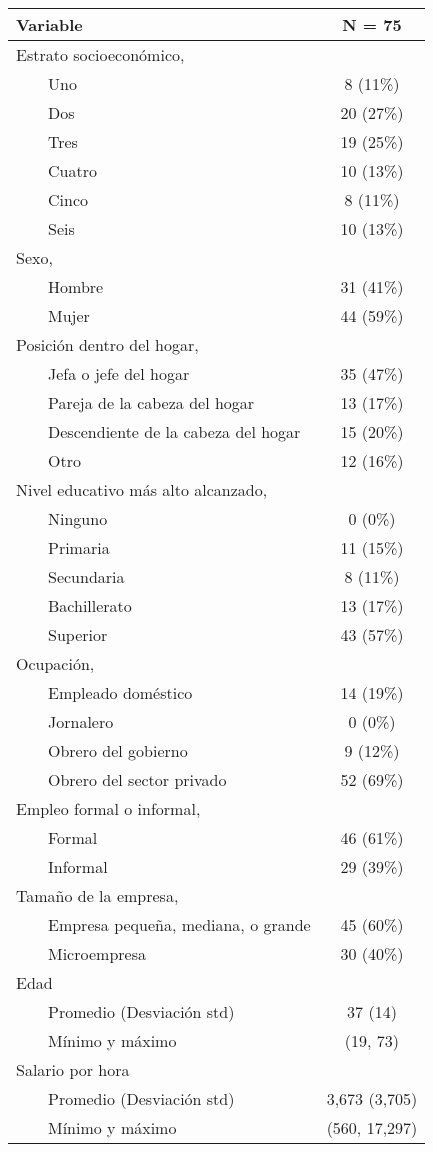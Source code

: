 \begin{longtable}{lc}
\toprule
\textbf{Variable} & \textbf{N = 75} \\ 
\midrule
Estrato socioeconómico,  &  \\ 
    Uno & 8  (11\%) \\ 
    Dos & 20  (27\%) \\ 
    Tres & 19  (25\%) \\ 
    Cuatro & 10  (13\%) \\ 
    Cinco & 8  (11\%) \\ 
    Seis & 10  (13\%) \\ 
Sexo,  &  \\ 
    Hombre & 31  (41\%) \\ 
    Mujer & 44  (59\%) \\ 
Posición dentro del hogar,  &  \\ 
    Jefa o jefe del hogar & 35  (47\%) \\ 
    Pareja de la cabeza del hogar & 13  (17\%) \\ 
    Descendiente de la cabeza del hogar & 15  (20\%) \\ 
    Otro & 12  (16\%) \\ 
Nivel educativo más alto alcanzado,  &  \\ 
    Ninguno & 0  (0\%) \\ 
    Primaria & 11  (15\%) \\ 
    Secundaria & 8  (11\%) \\ 
    Bachillerato & 13  (17\%) \\ 
    Superior & 43  (57\%) \\ 
Ocupación,  &  \\ 
    Empleado doméstico & 14  (19\%) \\ 
    Jornalero & 0  (0\%) \\ 
    Obrero del gobierno & 9  (12\%) \\ 
    Obrero del sector privado & 52  (69\%) \\ 
Empleo formal o informal,  &  \\ 
    Formal & 46  (61\%) \\ 
    Informal & 29  (39\%) \\ 
Tamaño de la empresa,  &  \\ 
    Empresa pequeña, mediana, o grande & 45  (60\%) \\ 
    Microempresa & 30  (40\%) \\ 
Edad &  \\ 
    Promedio (Desviación std) & 37 (14) \\ 
    Mínimo y máximo & (19, 73) \\ 
Salario por hora &  \\ 
    Promedio (Desviación std) & 3,673 (3,705) \\ 
    Mínimo y máximo & (560, 17,297) \\ 
\bottomrule
\end{longtable}

